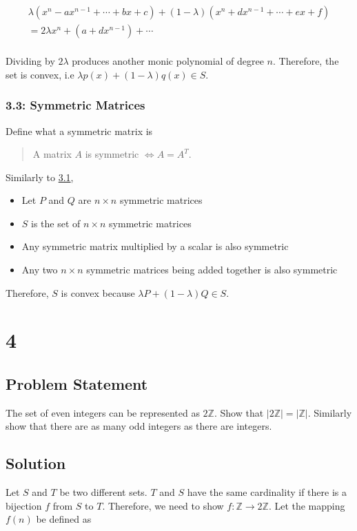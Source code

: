 \documentclass[11pt,a4paper,final]{article}
\begin{document}
\begin{equation*}
\begin{array}{l}
\lambda (x^n - ax^{n-1} + \cdots + bx + c) + (1- \lambda)(x^n + dx^{n-1} + \cdots + ex + f) \\
= 2 \lambda x^n + (a+d x^{n-1}) + \cdots \\
\end{array}
\end{equation*}

Dividing by \(2\lambda\) produces another monic polynomial of degree \(n\). Therefore, the set is convex, i.e \(\lambda p(x) + (1 - \lambda)q(x) \in S\).

\subsubsection{3.3: Symmetric Matrices}
\label{sec:orgc0214b7}
Define what a symmetric matrix is

\begin{quote}
A matrix \(A\) is symmetric \(\iff A = A^T\).
\end{quote}

Similarly to \hyperref[sec:3.1]{3.1},

\begin{itemize}
\item Let \(P\) and \(Q\) are \(n \times n\) symmetric matrices
\item \(S\) is the set of \(n \times n\) symmetric matrices
\item Any symmetric matrix multiplied by a scalar is also symmetric
\item Any two \(n \times n\) symmetric matrices being added together is also symmetric
\end{itemize}

Therefore, \(S\) is convex because \(\lambda P + (1 - \lambda)Q \in S\).

\section{4}
\label{sec:org87f357f}
\subsection{Problem Statement}
\label{sec:org7daabd1}
The set of even integers can be represented as \(2\mathbb{Z}\). Show that \(|2\mathbb{Z}| = |\mathbb{Z}|\). Similarly show that there are as many odd
integers as there are integers.

\subsection{Solution}
\label{sec:org4a1c6a8}
Let \(S\) and \(T\) be two different sets. \(T\) and \(S\) have the same cardinality if there is a bijection \(f\) from \(S\) to
\(T\). Therefore, we need to show \(f : \mathbb{Z} \rightarrow 2\mathbb{Z}\). Let the mapping \(f(n)\) be defined as
\end{document}

